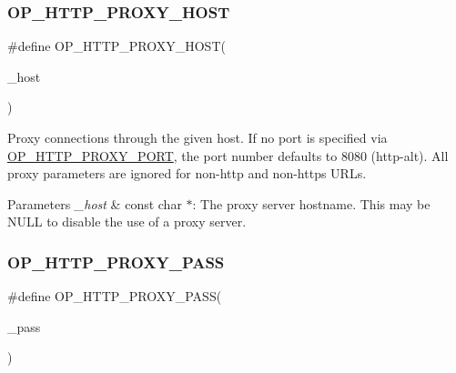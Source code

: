 \subsubsection{\texorpdfstring{O\+P\+\_\+\+H\+T\+T\+P\+\_\+\+P\+R\+O\+X\+Y\+\_\+\+H\+O\+ST}{OP\_HTTP\_PROXY\_HOST}}
{\footnotesize\ttfamily \#define O\+P\+\_\+\+H\+T\+T\+P\+\_\+\+P\+R\+O\+X\+Y\+\_\+\+H\+O\+ST(\begin{DoxyParamCaption}\item[{}]{\+\_\+host }\end{DoxyParamCaption})}

Proxy connections through the given host. If no port is specified via \hyperlink{group__url__options_ga838d23878f4135691684203baa75ed0c}{O\+P\+\_\+\+H\+T\+T\+P\+\_\+\+P\+R\+O\+X\+Y\+\_\+\+P\+O\+RT}, the port number defaults to 8080 (http-\/alt). All proxy parameters are ignored for non-\/http and non-\/https U\+R\+Ls. 
\begin{DoxyParams}{Parameters}
{\em \+\_\+host} & {\ttfamily const char $\ast$}\+: The proxy server hostname. This may be {\ttfamily N\+U\+LL} to disable the use of a proxy server. \\
\hline
\end{DoxyParams}
\mbox{\label{group__url__options_gaad96c33557407e406cca89477b2e7892}} 
\subsubsection{\texorpdfstring{O\+P\+\_\+\+H\+T\+T\+P\+\_\+\+P\+R\+O\+X\+Y\+\_\+\+P\+A\+SS}{OP\_HTTP\_PROXY\_PASS}}
{\footnotesize\ttfamily \#define O\+P\+\_\+\+H\+T\+T\+P\+\_\+\+P\+R\+O\+X\+Y\+\_\+\+P\+A\+SS(\begin{DoxyParamCaption}\item[{}]{\+\_\+pass }\end{DoxyParamCaption})}

